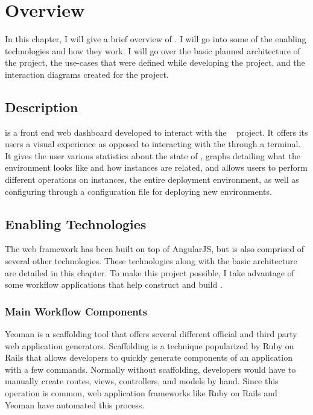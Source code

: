 
\cleardoublepage

\chapter{\projectName{} Overview}
\label{makereference2}

In this chapter, I will give a brief overview of \projectName{}. I will go into some of the enabling technologies and how they work. I will go over the basic planned architecture of the project, the use-cases that were defined while developing the project, and the interaction diagrams created for the project.

\section{Description}
\label{makereference2.1}

\projectName{} is a front end web dashboard developed to interact with the \ancor{} ~\cite{DMatrix:Unruh:2014} project. It offers its users a visual experience as opposed to interacting with the \ancorcli{} through a terminal. It gives the user various statistics about the state of \ancor{}, graphs detailing what the environment looks like and how instances are related, and allows users to perform different operations on instances, the entire deployment environment, as well as configuring \ancor{} through a configuration file for deploying new environments.

\section{Enabling Technologies}
\label{makereference2.2}

The web framework has been built on top of AngularJS, but is also comprised of several other technologies. These technologies along with the basic \projectName{} architecture are detailed in this chapter. To make this project possible, I take advantage of some workflow applications that help construct and build \projectName{}.

\subsection{Main Workflow Components}

Yeoman\cite{Note:Yeoman:2014} is a scaffolding tool that offers several different official and third party web application generators. Scaffolding is a technique popularized by Ruby on Rails that allows developers to quickly generate components of an application with a few commands. Normally without scaffolding, developers would have to manually create routes, views, controllers, and models by hand. Since this operation is common, web application frameworks like Ruby on Rails and Yeoman have automated this process.

